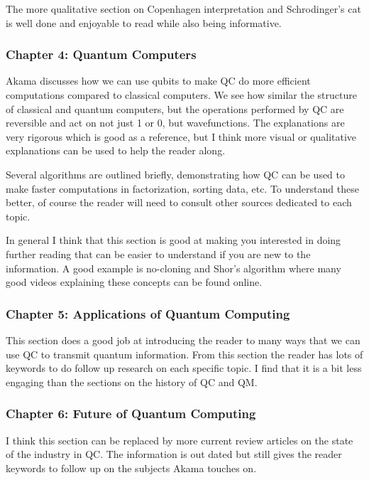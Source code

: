 \documentclass[conf]{new-aiaa}
\begin{document}
The more qualitative section on Copenhagen interpretation and Schrodinger's cat is well done and enjoyable to read while also being informative.

\subsubsection{Chapter 4: Quantum Computers}

Akama discusses how we can use qubits to make QC do more efficient computations compared to classical computers. We see how similar the structure of classical and quantum computers, but the operations performed by QC are reversible and act on not just 1 or 0, but wavefunctions. The explanations are very rigorous which is good as a reference, but I think more visual or qualitative explanations can be used to help the reader along.

Several algorithms are outlined briefly, demonstrating how QC can be used to make faster computations in factorization, sorting data, etc. To understand these better, of course the reader will need to consult other sources dedicated to each topic.

In general I think that this section is good at making you interested in doing further reading that can be easier to understand if you are new to the information. A good example is no-cloning and Shor's algorithm where many good videos explaining these concepts can be found online.

\subsubsection{Chapter 5: Applications of Quantum Computing}

This section does a good job at introducing the reader to many ways that we can use QC to transmit quantum information. From this section the reader has lots of keywords to do follow up research on each specific topic. I find that it is a bit less engaging than the sections on the history of QC and QM.

\subsubsection{Chapter 6: Future of Quantum Computing}

I think this section can be replaced by more current review articles on the state of the industry in QC. The information is out dated but still gives the reader keywords to follow up on the subjects Akama touches on. 
\end{document}
